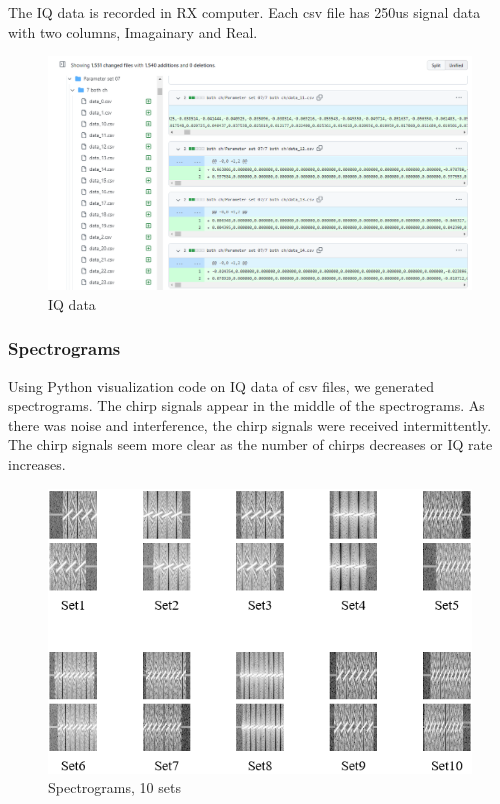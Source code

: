     
    The IQ data is recorded in RX computer. Each csv file has 250us signal data with two columns, Imagainary and Real. \\
    \vspace{-4mm}  
    \begin{figure}[!h]\centering
    \hspace{15mm}
		\includegraphics[width=.99\textwidth]{image/week04/1-1-a.png}
		\caption{\footnotesize IQ data}
		\vspace{-10pt}
    \end{figure}
    
\clearpage 
    \subsubsection*{Spectrograms}
    Using Python visualization code on IQ data of csv files, we generated spectrograms. The chirp signals appear in the middle of the spectrograms. As there was noise and interference, the chirp signals were received intermittently. The chirp signals seem more clear as the number of chirps decreases or IQ rate increases. \\
    \vspace{-4mm}  
    \begin{figure}[!h]\centering
    \hspace{15mm}
		\includegraphics[width=.95\textwidth]{image/week04/1-1-1.png}
		\caption{\footnotesize Spectrograms, 10 sets}
		\vspace{-10pt}
    \end{figure}
    
